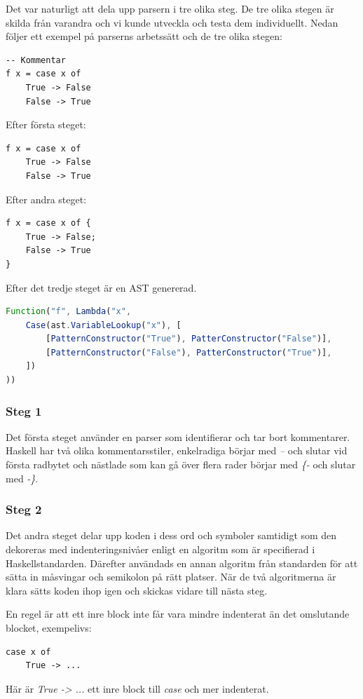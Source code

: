 Det var naturligt att dela upp parsern i tre olika steg. De tre olika stegen är skilda från varandra och vi kunde utveckla och testa dem individuellt.
Nedan följer ett exempel på parserns arbetssätt och de tre olika stegen:
\begin{lstlisting}
-- Kommentar
f x = case x of
    True -> False
    False -> True
\end{lstlisting}

Efter första steget:
\begin{lstlisting}
f x = case x of
    True -> False
    False -> True
\end{lstlisting}

Efter andra steget:
\begin{lstlisting}
f x = case x of {
    True -> False;
    False -> True
}
\end{lstlisting}

Efter det tredje steget är en AST genererad.
\begin{lstlisting}[language=javascript]
Function("f", Lambda("x", 
    Case(ast.VariableLookup("x"), [
        [PatternConstructor("True"), PatterConstructor("False")],
        [PatternConstructor("False"), PatterConstructor("True")],
    ])
))
\end{lstlisting}

\subsubsection{Steg 1}
Det första steget använder en parser som identifierar och tar bort kommentarer. 
Haskell har två olika kommentarsstiler, enkelradiga börjar med \emph{--} och slutar vid första radbytet och 
nästlade som kan gå över flera rader börjar med \emph{\{-} och slutar med \emph{-\}}.

\subsubsection{Steg 2}
Det andra steget delar upp koden i dess ord och symboler samtidigt som den dekoreras med indenteringsnivåer enligt en algoritm 
som är specifierad i Haskellstandarden. Därefter användads en annan algoritm från standarden för att sätta in måsvingar och semikolon på rätt platser. 
När de två algoritmerna är klara sätts koden ihop igen och skickas vidare till nästa steg.

En regel är att ett inre block inte får vara mindre indenterat än det omslutande blocket, exempelivs:
\begin{lstlisting}
case x of
    True -> ...
\end{lstlisting}
Här är \emph{True -> ...} ett inre block till \emph{case} och mer indenterat.

